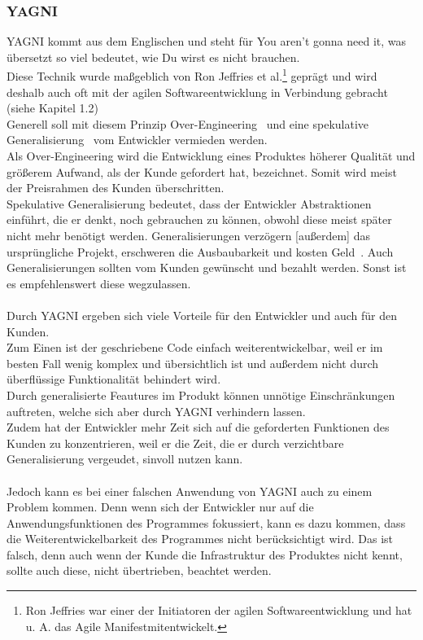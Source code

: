 \documentclass[a4paper, 10pt]{scrartcl}
\begin{document}
\subsubsection{YAGNI}
\glqq YAGNI\grqq{} kommt aus dem Englischen und steht für \glqq You aren't gonna need it\grqq, was übersetzt so viel bedeutet, wie \glqq Du wirst es nicht brauchen.\grqq\\
Diese Technik wurde maßgeblich von Ron Jeffries et al.\footnote[1]{Ron Jeffries war einer der Initiatoren der agilen Softwareentwicklung und hat u. A. das \glqq Agile Manifest\grqq mitentwickelt.} geprägt und wird deshalb auch oft mit der agilen Softwareentwicklung in Verbindung gebracht (siehe Kapitel 1.2) \citep{Jeffries}\\
Generell soll mit diesem Prinzip \glqq Over-Engineering\grqq \  \cite{goll_entwurfsprinzipien} und eine \glqq spekulative Generalisierung\grqq\  \cite{goll_entwurfsprinzipien} vom Entwickler vermieden werden.\\
Als Over-Engineering wird die Entwicklung eines Produktes höherer Qualität und größerem Aufwand, als der Kunde gefordert hat, bezeichnet. Somit wird meist der Preisrahmen des Kunden überschritten.\\
Spekulative Generalisierung bedeutet, dass der Entwickler Abstraktionen einführt, die er denkt, noch gebrauchen zu können, obwohl diese meist später nicht mehr benötigt werden. \glqq Generalisierungen verzögern [außerdem] das ursprüngliche Projekt, erschweren die Ausbaubarkeit und kosten Geld\grqq \ \cite{goll_entwurfsprinzipien}. Auch Generalisierungen sollten vom Kunden gewünscht und bezahlt werden. Sonst ist es empfehlenswert diese wegzulassen.\\\\
Durch YAGNI ergeben sich viele Vorteile für den Entwickler und auch für den Kunden.\\
Zum Einen ist der geschriebene Code einfach weiterentwickelbar, weil er im besten Fall wenig komplex und übersichtlich ist und außerdem nicht durch überflüssige Funktionalität behindert wird.\\
Durch generalisierte Feautures im Produkt können unnötige Einschränkungen auftreten, welche sich aber durch YAGNI verhindern lassen.\\
Zudem hat der Entwickler mehr Zeit sich auf die geforderten Funktionen des Kunden zu konzentrieren, weil er die Zeit, die er durch verzichtbare Generalisierung vergeudet, sinvoll nutzen kann.\\\\
Jedoch kann es bei einer falschen Anwendung von YAGNI auch zu einem Problem kommen. Denn wenn sich der Entwickler nur auf die Anwendungsfunktionen des Programmes fokussiert, kann es dazu kommen, dass die Weiterentwickelbarkeit des Programmes nicht berücksichtigt wird. Das ist falsch, denn auch wenn der Kunde die Infrastruktur des Produktes nicht kennt, sollte auch diese, nicht übertrieben, beachtet werden. \citep{goll_entwurfsprinzipien}
\end{document}
